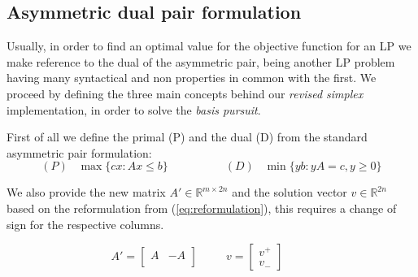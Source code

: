 \documentclass[journal,article,submit,electronics,pdftex]{Definitions/mdpi}
\begin{document}
{\subsection{Asymmetric dual pair formulation}

Usually, in order to find an optimal value for the objective function for an LP we make reference to the dual of the asymmetric pair, being another LP problem having many syntactical and non properties in common with the first. We proceed by defining the three main concepts behind our \emph{revised simplex} implementation, in order to solve the \emph{basis pursuit}.

First of all we define the primal (P) and the dual (D) from the standard asymmetric pair formulation:
\begin{equation}
(P) \hspace{10pt}\max \{cx : Ax \leq b\} \hspace{60pt}(D)\hspace{10pt}
\min \{yb : yA = c, y \geq 0 \}
\end{equation}

We also provide the new matrix $A' \in \mathbb{R}^{m \times 2n}$ and the solution vector $v \in \mathbb{R}^{2n}$ based on the reformulation from (\ref{eq:reformulation}), this requires a change of sign for the respective columns.

\begin{equation} \label{eq:partitioned_system}
A' = 
    \begin{bmatrix}
    A & -A\\
    \end{bmatrix}
    \hspace{30pt}
    v =
    \begin{bmatrix}
    v^+\\v_{-}
    \end{bmatrix}
    \hspace{30pt}
\end{equation}

}
\end{document}
